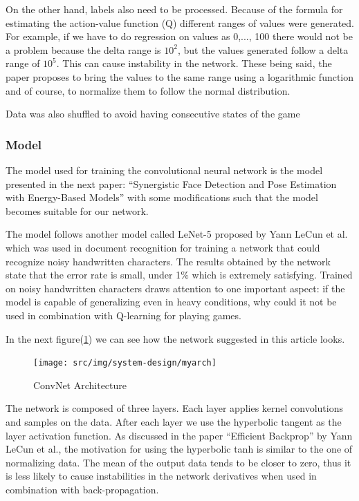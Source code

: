 On the other hand, labels also need to be processed. Because of the formula for estimating the action-value function (Q) different ranges of values were generated. For example, if we have to do regression on values as 0,..., 100 there would not be a problem because the delta range is $10^2$, but the values generated follow a delta range of $10^5$. This can cause instability in the network. These being said, the paper proposes to bring the values to the same range using a logarithmic function and of course, to normalize them to follow the normal distribution.

Data was also shuffled to avoid having consecutive states of the game
\newpage
\subsubsection{Model}

The model used for training the convolutional neural network is the model presented in the next paper: ``Synergistic Face Detection and Pose Estimation with Energy-Based Models''\cite{energy-based} with some modifications such that the model becomes suitable for our network.

The model follows another model called LeNet-5 proposed by Yann LeCun et al. which was used in document recognition\cite{basedlearning} for training a network that could recognize noisy handwritten characters. The results obtained by the network state that the error rate is small, under 1$\%$ which is extremely satisfying. Trained on noisy handwritten characters draws attention to one important aspect: if the model is capable of generalizing even in heavy conditions, why could it not be used in combination with Q-learning for playing games.

In the next figure(\ref{fig:myarch}) we can see how the network suggested in this article looks. 

\begin{figure}[h]
	\begin{center}
		\texttt{[image: src/img/system-design/myarch]}
		\caption{ConvNet Architecture} \label{fig:myarch}
    \end{center}
\end{figure}

The network is composed of three layers. Each layer applies kernel convolutions and samples on the data. After each layer we use the hyperbolic tangent as the layer activation function. As discussed in the paper ``Efficient Backprop'' by Yann LeCun et al., the motivation for using the hyperbolic tanh is similar to the one of normalizing data. The mean of the output data tends to be closer to zero, thus it is less likely to cause instabilities in the network derivatives when used in combination with back-propagation.


